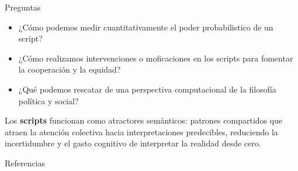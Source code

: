 \documentclass[aspectratio=169,xcolor=dvipsnames]{beamer}
\begin{document}
\begin{frame}{Preguntas}
   \begin{itemize}
    \item ¿Cómo podemos medir cuantitativamente el poder probabilistico de un script?
    \item ¿Cómo realizamos intervenciones o moficaciones en los scripts para fomentar la cooperación y la equidad?
    \item ¿Qué podemos rescatar de una perspectiva computacional de la filosofía política y social?
   \end{itemize} 
\end{frame}
\begin{frame}
    Los \textbf{scripts} funcionan como atractores semánticos: patrones compartidos que atraen la atención colectiva hacia interpretaciones predecibles, reduciendo la incertidumbre y el gasto cognitivo de interpretar la realidad desde cero.
\end{frame}
\begin{frame}[allowframebreaks]{Referencias}
  
  
\end{frame}
\end{document}
